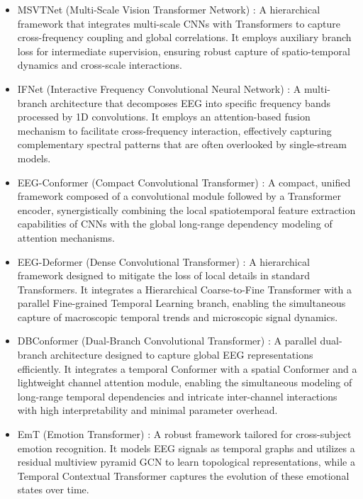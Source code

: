 \documentclass[journal]{IEEEtran}
\theoremstyle{plain}
\begin{document}
\begin{itemize}
\item MSVTNet (Multi-Scale Vision Transformer Network) \cite{liu2024msvtnet}: A hierarchical framework that integrates multi-scale CNNs with Transformers to capture cross-frequency coupling and global correlations. It employs auxiliary branch loss for intermediate supervision, ensuring robust capture of spatio-temporal dynamics and cross-scale interactions.
\item IFNet (Interactive Frequency Convolutional Neural Network) \cite{wang2023ifnet}: A multi-branch architecture that decomposes EEG into specific frequency bands processed by 1D convolutions. It employs an attention-based fusion mechanism to facilitate cross-frequency interaction, effectively capturing complementary spectral patterns that are often overlooked by single-stream models.
\item EEG-Conformer (Compact Convolutional Transformer) \cite{song2023eeg}: A compact, unified framework composed of a convolutional module followed by a Transformer encoder, synergistically combining the local spatiotemporal feature extraction capabilities of CNNs with the global long-range dependency modeling of attention mechanisms.
\item EEG-Deformer (Dense Convolutional Transformer) \cite{ding2024eeg}: A hierarchical framework designed to mitigate the loss of local details in standard Transformers. It integrates a Hierarchical Coarse-to-Fine Transformer with a parallel Fine-grained Temporal Learning branch, enabling the simultaneous capture of macroscopic temporal trends and microscopic signal dynamics.
\item DBConformer (Dual-Branch Convolutional Transformer) \cite{wang2025dbconformer}: A parallel dual-branch architecture designed to capture global EEG representations efficiently. It integrates a temporal Conformer with a spatial Conformer and a lightweight channel attention module, enabling the simultaneous modeling of long-range temporal dependencies and intricate inter-channel interactions with high interpretability and minimal parameter overhead.
\item EmT (Emotion Transformer) \cite{ding2025emt}: A robust framework tailored for cross-subject emotion recognition. It models EEG signals as temporal graphs and utilizes a residual multiview pyramid GCN to learn topological representations, while a Temporal Contextual Transformer captures the evolution of these emotional states over time.
\end{itemize}
\end{document}

